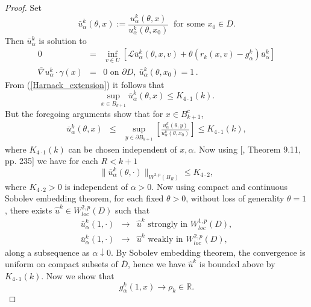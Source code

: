 \documentclass[11pt]{amsart}
\numberwithin{equation}{section}
\begin{document}
\begin{proof}
 
Set
$$
\bar u^k_{\alpha}(\theta,x):=\frac{ u^k_{\alpha}(\theta,x)}{u^k_{\alpha}(\theta,x_0)} %
\ \mbox{ for some } x_0\in D.
$$
Then $\bar u^k_{\alpha}$ is solution to 
\begin{equation}
\left.
\begin{array}{rcl}\label{monotone}
0 &=& \displaystyle{ \inf_{v \in U} \left[ \mathcal L \bar u^k_{\alpha}(\theta,x,v) + \theta
 (r_k(x,v)-g^k_{\alpha}) \bar u^k_{\alpha} \right] } \\
\displaystyle{ \bar \nabla  u^k_{\alpha}\cdot \gamma(x) } &=& 0 \mbox{ on } \partial D, \ 
 \bar u^k_{\alpha}(\theta,x_0)=1 \, .
\end{array}
\right.
\end{equation}   
From (\ref{Harnack_extension}) it follows that
$$
\sup_{x\in B_{k+1}} \bar u^k_{\alpha}(\theta,x) \leq K_{4 \cdot 1}(k).
$$
But the foregoing arguments show that for $x\in B^c_{k+1}$,
\begin{eqnarray*}
 \bar u^k_{\alpha}(\theta,x) &\leq& \sup_{ y\in \partial B_{k+1} } 
\left[ \frac{u^k_{\alpha}(\theta,y)}{u^k_{\alpha}(\theta,x_0)}\right] \leq K_{4 \cdot 1}(k), 
\end{eqnarray*}
where $K_{4 \cdot 1}(k)$ can be chosen independent of $x, \alpha$. Now using [\cite{gilbarg_trudinger}, Theorem 9.11, pp. 235] we have for each $R<k+1$
\begin{equation}\label{wpbound}
\|\bar u^k_{\alpha}(\theta,\cdot)\|_{W^{2,p}(B_R)} \leq K_{4 \cdot 2}, 
\end{equation}
where $K_{4 \cdot 2}>0$ is independent of $\alpha >0$. Now
using compact and continuous Sobolev embedding theorem, for each fixed $\theta>0$, without loss of generality $\theta=1$, there exists $\hat u^k \in  W^{2,p}_{loc}(D)$  such that 
\begin{eqnarray*}
\bar u^k_{\alpha}(1,\cdot) &\longrightarrow& \hat u^k  \mbox{ strongly in }   W^{1,p}_{loc}
(D), \\
\bar u^k_{\alpha}(1,\cdot) &\longrightarrow& \hat u^k  \mbox{ weakly in }  W^{2,p}_{loc}(D), %
\end{eqnarray*}
along a subsequence as $\alpha \downarrow 0$. By Sobolev embedding theorem, the convergence is uniform on compact subsets of 
$\overline{D}$, hence we have $\hat u^k$ is bounded above by $K_{4 \cdot 1}(k)$.
Now we show that 
$$
g^k_{\alpha}(1,x)  \longrightarrow \rho_k \in \mathbb R.
$$
\end{proof}
\end{document}
